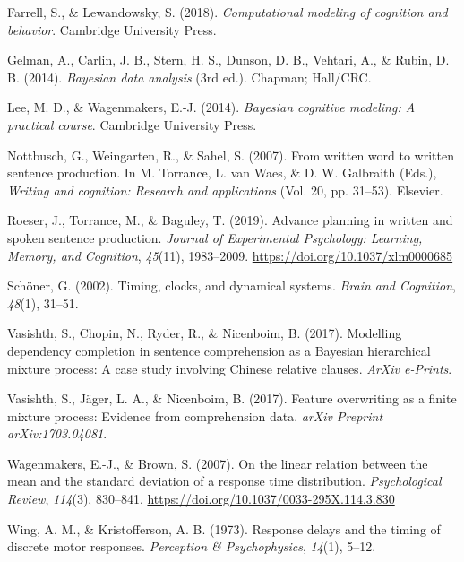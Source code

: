 \begin{appendix}
\hypertarget{refs}{}
\begin{CSLReferences}{1}{0}
\leavevmode\hypertarget{ref-farrell2018computational}{}%
Farrell, S., \& Lewandowsky, S. (2018). \emph{Computational modeling of
cognition and behavior}. Cambridge University Press.

\leavevmode\hypertarget{ref-gelman2014}{}%
Gelman, A., Carlin, J. B., Stern, H. S., Dunson, D. B., Vehtari, A., \&
Rubin, D. B. (2014). \emph{Bayesian data analysis} (3rd ed.). Chapman;
Hall/CRC.

\leavevmode\hypertarget{ref-lee2014bayesian}{}%
Lee, M. D., \& Wagenmakers, E.-J. (2014). \emph{Bayesian cognitive
modeling: A practical course}. Cambridge University Press.

\leavevmode\hypertarget{ref-not07}{}%
Nottbusch, G., Weingarten, R., \& Sahel, S. (2007). From written word to
written sentence production. In M. Torrance, L. van Waes, \& D. W.
Galbraith (Eds.), \emph{Writing and cognition: Research and
applications} (Vol. 20, pp. 31--53). Elsevier.

\leavevmode\hypertarget{ref-roeser2018advance}{}%
Roeser, J., Torrance, M., \& Baguley, T. (2019). Advance planning in
written and spoken sentence production. \emph{Journal of Experimental
Psychology: Learning, Memory, and Cognition}, \emph{45}(11), 1983--2009.
\url{https://doi.org/10.1037/xlm0000685}

\leavevmode\hypertarget{ref-schoner2002timing}{}%
Schöner, G. (2002). Timing, clocks, and dynamical systems. \emph{Brain
and Cognition}, \emph{48}(1), 31--51.

\leavevmode\hypertarget{ref-vasishth2017}{}%
Vasishth, S., Chopin, N., Ryder, R., \& Nicenboim, B. (2017). Modelling
dependency completion in sentence comprehension as a {B}ayesian
hierarchical mixture process: {A} case study involving {C}hinese
relative clauses. \emph{ArXiv e-Prints}.

\leavevmode\hypertarget{ref-vasishth2017feature}{}%
Vasishth, S., Jäger, L. A., \& Nicenboim, B. (2017). Feature overwriting
as a finite mixture process: Evidence from comprehension data.
\emph{arXiv Preprint arXiv:1703.04081}.

\leavevmode\hypertarget{ref-wagenmakers2007linear}{}%
Wagenmakers, E.-J., \& Brown, S. (2007). On the linear relation between
the mean and the standard deviation of a response time distribution.
\emph{Psychological Review}, \emph{114}(3), 830--841.
\url{https://doi.org/10.1037/0033-295X.114.3.830}

\leavevmode\hypertarget{ref-wing1973response}{}%
Wing, A. M., \& Kristofferson, A. B. (1973). Response delays and the
timing of discrete motor responses. \emph{Perception \& Psychophysics},
\emph{14}(1), 5--12.

\end{CSLReferences}
\end{appendix}
